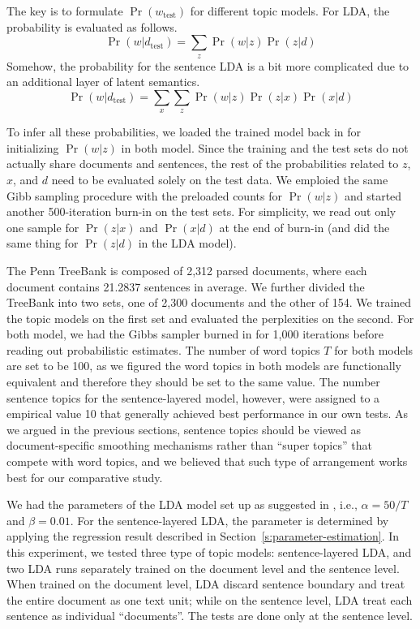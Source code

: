 The key is to formulate $\Pr(w_\mathrm{test})$ for different topic models.  For
LDA, the probability is evaluated as follows.  \[ \Pr(w|d_\mathrm{test}) =
\sum_z \Pr(w|z) \Pr(z|d) \] Somehow, the probability for the sentence LDA is a
bit more complicated due to an additional layer of latent semantics.  \[
\Pr(w|d_\mathrm{test}) = \sum_x \sum_z \Pr(w|z) \Pr(z|x) \Pr(x|d) \]

To infer all these probabilities, we loaded the trained model back in for
initializing $\Pr(w|z)$ in both model.  Since the training and the test sets do
not actually share documents and sentences, the rest of the probabilities
related to $z$, $x$, and $d$ need to be evaluated solely on the test data.  We
emploied the same Gibb sampling procedure with the preloaded counts for
$\Pr(w|z)$ and started another 500-iteration burn-in on the test sets.  For
simplicity, we read out only one sample for $\Pr(z|x)$ and $\Pr(x|d)$ at the
end of burn-in (and did the same thing for $\Pr(z|d)$ in the LDA model).

The Penn TreeBank is composed of 2,312 parsed documents, where each document
contains 21.2837 sentences in average.  We further divided the TreeBank into
two sets, one of 2,300 documents and the other of 154.  We trained the topic
models on the first set and evaluated the perplexities on the second.  For both
model, we had the Gibbs sampler burned in for 1,000 iterations before reading
out probabilistic estimates.  The number of word topics $T$ for both models are
set to be 100, as we figured the word topics in both models are functionally
equivalent and therefore they should be set to the same value.  The number
sentence topics for the sentence-layered model, however, were assigned to a
empirical value 10 that generally achieved best performance in our own tests.
As we argued in the previous sections, sentence topics should be viewed as
document-specific smoothing mechanisms rather than ``super topics'' that
compete with word topics, and we believed that such type of arrangement works
best for our comparative study. 

We had the parameters of the LDA model set up as suggested in
\cite{griffiths2004finding}, i.e., $\alpha = 50 / T$ and $\beta = 0.01$.  For
the sentence-layered LDA, the parameter is determined by applying the
regression result described in Section~\ref{s:parameter-estimation}.  In this
experiment, we tested three type of topic models: sentence-layered LDA, and two
LDA runs separately trained on the document level and the sentence level.  When
trained on the document level, LDA discard sentence boundary and treat the
entire document as one text unit; while on the sentence level, LDA treat each
sentence as individual ``documents''.  The tests are done only at the sentence
level.

